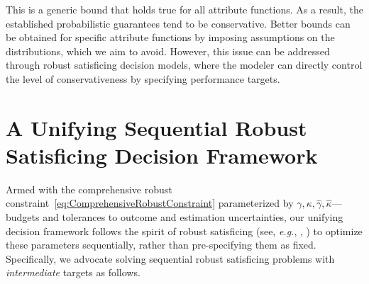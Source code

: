 \documentclass[opre, nonblindrev]{informswp}
\newcommand{\1}[1]{\mathds{1}{\left(#1\right)}}
\begin{document}
This is a generic bound that holds true for all attribute functions. As a result, the established probabilistic guarantees tend to be conservative. Better bounds can be obtained for specific attribute functions by imposing assumptions on the distributions, which we aim to avoid. However, this issue can be addressed through robust satisficing decision models, where the modeler can directly control the level of conservativeness by specifying performance targets.  

\section{A Unifying Sequential Robust Satisficing Decision Framework}
\label{sec:robust_satisficing_decision_framework}

Armed with the comprehensive robust constraint~\eqref{eq:ComprehensiveRobustConstraint} parameterized by $\gamma, \kappa, \hat \gamma, \hat \kappa$---budgets and tolerances to outcome and estimation uncertainties, our unifying decision framework follows the spirit of robust satisficing (see, \textit{e.g.}, \citealt{BenTal_et_al_2017globalized}, \citealt{Long_Sim_Zhou_2023robust}) to optimize these parameters sequentially, rather than pre-specifying them as fixed. Specifically, we advocate solving sequential robust satisficing problems with \textit{intermediate} targets as follows.
\end{document}

